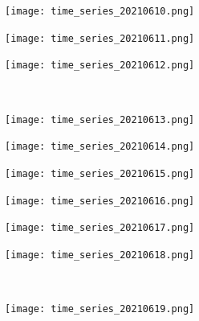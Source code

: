 \documentclass[10pt]{article}
\begin{document}
\begin{figure}[!h]
\begin{subfigure}[b]{0.166\linewidth}
    \end{subfigure}%
    \begin{subfigure}[b]{0.166\linewidth}
        \centering
        \texttt{[image: time\_series\_20210610.png]}
    \end{subfigure}%
    \begin{subfigure}[b]{0.166\linewidth}
        \centering
        \texttt{[image: time\_series\_20210611.png]}
    \end{subfigure}%
        \begin{subfigure}[b]{0.166\linewidth}
        \centering
        \texttt{[image: time\_series\_20210612.png]}
    \end{subfigure}
    \\
    \begin{subfigure}[b]{0.166\linewidth}
        \centering
        \texttt{[image: time\_series\_20210613.png]}
    \end{subfigure}%
    \begin{subfigure}[b]{0.166\linewidth}
        \centering
        \texttt{[image: time\_series\_20210614.png]}
    \end{subfigure}%
    \begin{subfigure}[b]{0.166\linewidth}
        \centering
        \texttt{[image: time\_series\_20210615.png]}
    \end{subfigure}%
    \begin{subfigure}[b]{0.166\linewidth}
        \centering
        \texttt{[image: time\_series\_20210616.png]}
    \end{subfigure}%
        \begin{subfigure}[b]{0.166\linewidth}
        \centering
        \texttt{[image: time\_series\_20210617.png]}
    \end{subfigure}%
    \begin{subfigure}[b]{0.166\linewidth}
        \centering
        \texttt{[image: time\_series\_20210618.png]}
    \end{subfigure}
    \\
    \begin{subfigure}[b]{0.166\linewidth}
        \centering
        \texttt{[image: time\_series\_20210619.png]}
    \end{subfigure}%
    \begin{subfigure}[b]{0.166\linewidth}

\end{subfigure}
\end{figure}
\end{document}
